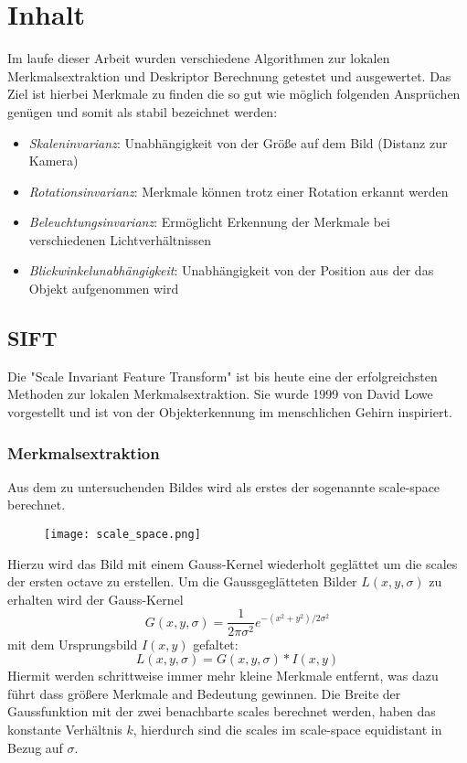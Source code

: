 \chapter{Inhalt}

Im laufe dieser Arbeit wurden verschiedene Algorithmen zur lokalen Merkmalsextraktion und Deskriptor Berechnung getestet und ausgewertet.
Das Ziel ist hierbei Merkmale zu finden die so gut wie möglich folgenden Ansprüchen genügen und somit als stabil bezeichnet werden:
\begin{itemize}
\item \emph{Skaleninvarianz}: Unabhängigkeit von der Größe auf dem Bild (Distanz zur Kamera)
\item \emph{Rotationsinvarianz}: Merkmale können trotz einer Rotation erkannt werden
\item \emph{Beleuchtungsinvarianz}: Ermöglicht Erkennung der Merkmale bei verschiedenen Lichtverhältnissen
\item \emph{Blickwinkelunabhängigkeit}: Unabhängigkeit von der Position aus der das Objekt aufgenommen wird
\end{itemize} 

\section{SIFT}

Die "Scale Invariant Feature Transform" ist bis heute eine der erfolgreichsten Methoden zur lokalen Merkmalsextraktion. Sie wurde 1999 von David Lowe vorgestellt und ist von der Objekterkennung im menschlichen Gehirn inspiriert.

\subsection{Merkmalsextraktion}

Aus dem zu untersuchenden Bildes wird als erstes der sogenannte \Gls{scale-space} berechnet.

\begin{figure}[h]
\texttt{[image: scale\_space.png]}
\centering
\end{figure}
Hierzu wird das Bild mit einem Gauss-Kernel wiederholt geglättet um die \Glspl{scale} der ersten \Gls{octave} zu erstellen.
Um die Gaussgeglätteten Bilder $ L (x, y, \sigma ) $ zu erhalten wird der Gauss-Kernel 
\begin{equation}
G(x, y, \sigma) = \frac{1}{2\pi\sigma^{2}}e^{-(x^{2}+y^{2})/2\sigma^{2}}
\end{equation}
 mit dem Ursprungsbild $ I(x, y) $ gefaltet:
\begin{equation}
L(x, y, \sigma) = G(x, y, \sigma)\ast I(x, y)
\end{equation}
Hiermit werden schrittweise immer mehr kleine Merkmale entfernt, was dazu führt dass größere Merkmale and Bedeutung gewinnen.
Die Breite der Gaussfunktion mit der zwei benachbarte \Glspl{scale} berechnet werden, haben das konstante Verhältnis $ k $, hierdurch sind die \Glspl{scale} im \Gls{scale-space} equidistant in Bezug auf $ \sigma $.

